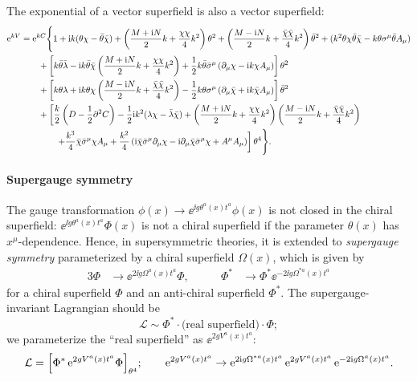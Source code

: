\documentclass[CheatSheet]{subfiles}
\begin{document}
The exponential of a vector superfield is also a vector superfield:
\begin{equation}
\begin{split}
 \mathop{}\!\mathrm{e}^{kV}&=\mathop{}\!\mathrm{e}^{kC}\Bigg\{
 1+\mathrm{i} k (\theta \chi-\bar\theta\bar{\chi})
 +\left(\frac{M+\mathrm{i} N}{2}k+\frac{\chi\chi}{4}k^2\right) \theta^2
 +\left(\frac{M-\mathrm{i} N}{2}k+\frac{\bar\chi\bar\chi}{4}k^2\right) \bar\theta^2
 +(k^2\theta \chi\bar\theta\bar{\chi}-k\theta \sigma^{\mu}\bar\theta A_{\mu})
 \\&\qquad
 +\left[k\bar\theta \bar\lambda-\mathrm{i} k \bar\theta \bar\chi\left(\frac{M+\mathrm{i} N}{2}k+\frac{\chi\chi}{4}k^2\right)
 +\frac12 k\bar\theta\bar\sigma^{\mu}\left(\partial_{\mu}\chi -\mathrm{i} k \chi A_\mu\right)
 \right] \theta^2
 \\&\qquad
 +\left[k\theta \lambda+\mathrm{i} k \theta \chi\left(\frac{M-\mathrm{i} N}{2}k+\frac{\bar{\chi}\bar{\chi}}{4}k^2\right)
 -\frac12 k\theta \sigma^{\mu}\left(\partial_{\mu}\bar{\chi}+\mathrm{i} k \bar\chi A_\mu\right)
 \right] \bar\theta^2
 \\&\qquad
 +\left[
 \frac{k}{2} \left(D-\frac12\partial^2 C\right)
 -\frac{1}{2} \mathrm{i} k^2 (\lambda\chi-\bar\lambda\bar\chi)
 + \left(\frac{M+\mathrm{i} N}{2}k+\frac{\chi\chi}{4}k^2\right)\left(\frac{M-\mathrm{i} N}{2}k+\frac{\bar\chi\bar\chi}{4}k^2\right)
 \right.\\&\qquad\qquad\left.
 +\frac{k^3}{4} \bar\chi\bar\sigma^{\mu}\chi A_{\mu}
 +\frac{k^2}{4}\left(\mathrm{i} \bar\chi\bar\sigma^{\mu}\partial_{\mu}\chi-\mathrm{i} \partial_{\mu}\bar\chi\bar\sigma^{\mu}\chi+A^{\mu}A_{\mu}\right)
 \right]\theta^4\Bigg\}.
\end{split}
\end{equation}
\paragraph{Supergauge symmetry}
The gauge transformation $\phi(x)\to\ee^{\ii g \theta^a(x)t^a}\phi(x)$ is not closed in the chiral superfield: $\ee^{\ii g \theta^a(x)t^a}\Phi(x)$ is not a chiral superfield if the parameter $\theta(x)$ has $x^\mu$-dependence.
Hence, in supersymmetric theories, it is extended to \emph{supergauge symmetry} parameterized by a chiral superfield $\Omega(x)$, which is given by
\begin{alignat}{3}
 \Phi   &\to\ee^{2\ii g \Omega^a(x) t^a}\Phi,
&\qquad
 \Phi^* &\to\Phi^*\ee^{-2\ii g \Omega^{*a}(x) t^a}
\end{alignat}
for a chiral superfield $\Phi$ and an anti-chiral superfield $\Phi^*$.
The supergauge-invariant Lagrangian should be
\begin{equation}
 \mathcal L \sim \Phi^*\cdot\text{(real superfield)}\cdot\Phi;
\end{equation}
we parameterize the ``real superfield'' as $\ee^{2g V^a(x)t^a}$:
\begin{equation}
 \mathcal L = \Bigl[\Phi^*\mathop{}\!\mathrm{e}^{2g V^a(x)t^a}\Phi\Bigr]_{\theta^4};
\qquad
 \mathop{}\!\mathrm{e}^{2g V^a(x)t^a}\to
\mathop{}\!\mathrm{e}^{2\mathrm{i} g \Omega^{*a}(x) t^a}
 \mathop{}\!\mathrm{e}^{2g V^a(x)t^a}
\mathop{}\!\mathrm{e}^{-2\mathrm{i} g \Omega^a(x) t^a}.
\end{equation}
\end{document}
